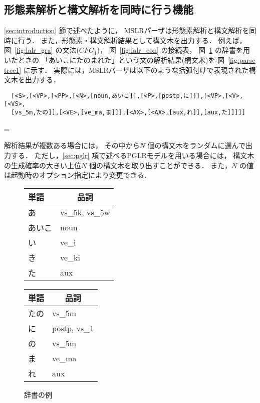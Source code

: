 \subsection{形態素解析と構文解析を同時に行う機能}
\label{sec:analysis}

\ref{sec:introduction} 節で述べたように，
MSLRパーザは形態素解析と構文解析を同時に行う\cite{tanaka:95:a}．
また，形態素・構文解析結果として構文木を出力する．
例えば，
図~\ref{fig:lalr_gra} の文法($CFG_1$)，
図~\ref{fig:lalr_con} の接続表，
図~\ref{fig:parser_dic} の辞書を用いたときの
「あいこにたのまれた」という文の解析結果(構文木)を
図~\ref{fig:parse tree1} に示す．
実際には，MSLRパーザは以下のような括弧付けで表現された構文木を出力する．

\normalbaselineskip
\begin{verbatim}
  [<S>,[<VP>,[<PP>,[<N>,[noun,あいこ]],[<P>,[postp,に]]],[<VP>,[<V>,[<VS>,
  [vs_5m,たの]],[<VE>,[ve_ma,ま]]],[<AX>,[<AX>,[aux,れ]],[aux,た]]]]]
\end{verbatim}
\baselineskip=\normalbaselineskip

\noindent
解析結果が複数ある場合には，
その中から$N$ 個の構文木をランダムに選んで出力する．
ただし，\ref{sec:pglr} 項で述べるPGLRモデルを用いる場合には，
構文木の生成確率の大きい上位$N$ 個の構文木を取り出すことができる．
また，$N$ の値は起動時のオプション指定により変更できる．

\begin{figure}[tbp]
  \begin{center}
    \begin{tabular}{l|l}
      単語   & \multicolumn{1}{c}{品詞} \\ \hline
      あ     & vs\_5k, vs\_5w \\[-1mm]
      あいこ & noun \\[-1mm]
      い     & ve\_i \\[-1mm]
      き     & ve\_ki \\[-1mm]
      た     & aux \\[-1mm]
    \end{tabular}
    \hspace*{15mm}
    \begin{tabular}{l|l}
      単語   & \multicolumn{1}{c}{品詞} \\ \hline
      たの   & vs\_5m \\[-1mm]
      に     & postp, vs\_1 \\[-1mm]
      の     & vs\_5m \\[-1mm]
      ま     & ve\_ma \\[-1mm]
      れ     & aux \\[-1mm]
    \end{tabular}

    \caption{辞書の例}
    \label{fig:parser_dic}
  \end{center}
\end{figure}

